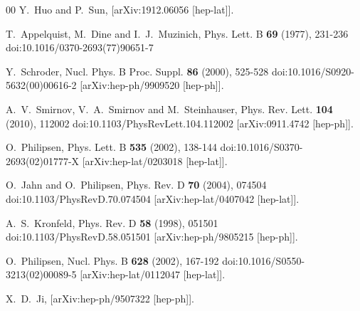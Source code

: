 \documentclass[preprint,12pt]{elsarticle}
\begin{document}
\begin{thebibliography}{00}
Y.~Huo and P.~Sun,
[arXiv:1912.06056 [hep-lat]].

T.~Appelquist, M.~Dine and I.~J.~Muzinich,
Phys. Lett. B \textbf{69} (1977), 231-236
doi:10.1016/0370-2693(77)90651-7

Y.~Schroder,
Nucl. Phys. B Proc. Suppl. \textbf{86} (2000), 525-528
doi:10.1016/S0920-5632(00)00616-2
[arXiv:hep-ph/9909520 [hep-ph]].

A.~V.~Smirnov, V.~A.~Smirnov and M.~Steinhauser,
Phys. Rev. Lett. \textbf{104} (2010), 112002
doi:10.1103/PhysRevLett.104.112002
[arXiv:0911.4742 [hep-ph]].

O.~Philipsen,
Phys. Lett. B \textbf{535} (2002), 138-144
doi:10.1016/S0370-2693(02)01777-X
[arXiv:hep-lat/0203018 [hep-lat]].

O.~Jahn and O.~Philipsen,
Phys. Rev. D \textbf{70} (2004), 074504
doi:10.1103/PhysRevD.70.074504
[arXiv:hep-lat/0407042 [hep-lat]].

A.~S.~Kronfeld,
Phys. Rev. D \textbf{58} (1998), 051501
doi:10.1103/PhysRevD.58.051501
[arXiv:hep-ph/9805215 [hep-ph]].

O.~Philipsen,
Nucl. Phys. B \textbf{628} (2002), 167-192
doi:10.1016/S0550-3213(02)00089-5
[arXiv:hep-lat/0112047 [hep-lat]].

X.~D.~Ji,
[arXiv:hep-ph/9507322 [hep-ph]].


\end{thebibliography}
\end{document}
